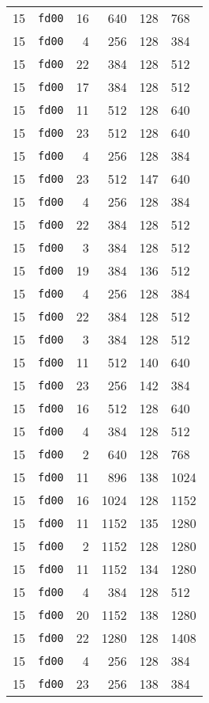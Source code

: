 \documentclass{article}
\begin{document}
\begin{table}[h!]
\begin{tabular}{llrrrl}
    15 & \texttt{fd00} & 16 & 640 & 128 & 768 \\
    15 & \texttt{fd00} & 4 & 256 & 128 & 384 \\
    15 & \texttt{fd00} & 22 & 384 & 128 & 512 \\
    15 & \texttt{fd00} & 17 & 384 & 128 & 512 \\
    15 & \texttt{fd00} & 11 & 512 & 128 & 640 \\
    15 & \texttt{fd00} & 23 & 512 & 128 & 640 \\
    15 & \texttt{fd00} & 4 & 256 & 128 & 384 \\
    15 & \texttt{fd00} & 23 & 512 & 147 & 640 \\
    15 & \texttt{fd00} & 4 & 256 & 128 & 384 \\
    15 & \texttt{fd00} & 22 & 384 & 128 & 512 \\
    15 & \texttt{fd00} & 3 & 384 & 128 & 512 \\
    15 & \texttt{fd00} & 19 & 384 & 136 & 512 \\
    15 & \texttt{fd00} & 4 & 256 & 128 & 384 \\
    15 & \texttt{fd00} & 22 & 384 & 128 & 512 \\
    15 & \texttt{fd00} & 3 & 384 & 128 & 512 \\
    15 & \texttt{fd00} & 11 & 512 & 140 & 640 \\
    15 & \texttt{fd00} & 23 & 256 & 142 & 384 \\
    15 & \texttt{fd00} & 16 & 512 & 128 & 640 \\
    15 & \texttt{fd00} & 4 & 384 & 128 & 512 \\
    15 & \texttt{fd00} & 2 & 640 & 128 & 768 \\
    15 & \texttt{fd00} & 11 & 896 & 138 & 1024 \\
    15 & \texttt{fd00} & 16 & 1024 & 128 & 1152 \\
    15 & \texttt{fd00} & 11 & 1152 & 135 & 1280 \\
    15 & \texttt{fd00} & 2 & 1152 & 128 & 1280 \\
    15 & \texttt{fd00} & 11 & 1152 & 134 & 1280 \\
    15 & \texttt{fd00} & 4 & 384 & 128 & 512 \\
    15 & \texttt{fd00} & 20 & 1152 & 138 & 1280 \\
    15 & \texttt{fd00} & 22 & 1280 & 128 & 1408 \\
    15 & \texttt{fd00} & 4 & 256 & 128 & 384 \\
    15 & \texttt{fd00} & 23 & 256 & 138 & 384 \\

\end{tabular}
\end{table}
\end{document}
